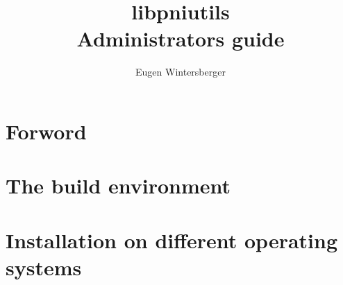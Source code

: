 \documentclass[a4paper,twoside]{book}
\author{Eugen Wintersberger}
\title{{\Huge libpniutils\\ Administrators guide}}
\begin{document}
\maketitle
\tableofcontents

\chapter{Forword}

\chapter{The build environment}

\chapter{Installation on different operating systems}
\end{document}
